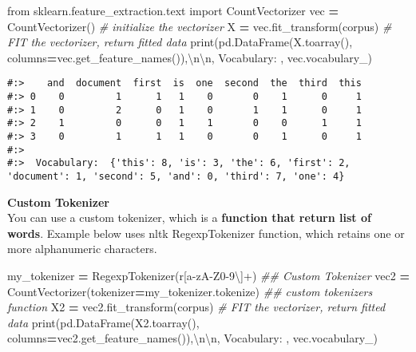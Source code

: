 \documentclass[
]{book}
\newenvironment{Shaded}{\begin{snugshade}}{\end{snugshade}}
\newcommand{\BuiltInTok}[1]{#1}
\newcommand{\CharTok}[1]{\textcolor[rgb]{0.5,0.5,0.5}{#1}}
\newcommand{\CommentTok}[1]{\textcolor[rgb]{0.37,0.37,0.37}{\textit{#1}}}
\newcommand{\ImportTok}[1]{#1}
\newcommand{\NormalTok}[1]{#1}
\newcommand{\OperatorTok}[1]{\textcolor[rgb]{0.43,0.43,0.43}{\textbf{#1}}}
\newcommand{\StringTok}[1]{\textcolor[rgb]{0.5,0.5,0.5}{#1}}
\newcommand{\VerbatimStringTok}[1]{\textcolor[rgb]{0.5,0.5,0.5}{#1}}
\begin{document}
\begin{Shaded}
\begin{Highlighting}[]
\ImportTok{from}\NormalTok{ sklearn.feature\_extraction.text }\ImportTok{import}\NormalTok{ CountVectorizer}
\NormalTok{vec }\OperatorTok{=}\NormalTok{ CountVectorizer()          }\CommentTok{\# initialize the vectorizer}
\NormalTok{X   }\OperatorTok{=}\NormalTok{ vec.fit\_transform(corpus)  }\CommentTok{\# FIT the vectorizer, return fitted data}
\BuiltInTok{print}\NormalTok{(pd.DataFrame(X.toarray(), columns}\OperatorTok{=}\NormalTok{vec.get\_feature\_names()),}\StringTok{\textquotesingle{}}\CharTok{\textbackslash{}n\textbackslash{}n}\StringTok{\textquotesingle{}}\NormalTok{,}
      \StringTok{\textquotesingle{}Vocabulary: \textquotesingle{}}\NormalTok{, vec.vocabulary\_)}
\end{Highlighting}
\end{Shaded}

\begin{verbatim}
#:>    and  document  first  is  one  second  the  third  this
#:> 0    0         1      1   1    0       0    1      0     1
#:> 1    0         2      0   1    0       1    1      0     1
#:> 2    1         0      0   1    1       0    0      1     1
#:> 3    0         1      1   1    0       0    1      0     1 
#:> 
#:>  Vocabulary:  {'this': 8, 'is': 3, 'the': 6, 'first': 2, 'document': 1, 'second': 5, 'and': 0, 'third': 7, 'one': 4}
\end{verbatim}

\textbf{Custom Tokenizer}\\
You can use a custom tokenizer, which is a \textbf{function that return list of words}. Example below uses nltk RegexpTokenizer function, which retains one or more alphanumeric characters.

\begin{Shaded}
\begin{Highlighting}[]
\NormalTok{my\_tokenizer }\OperatorTok{=}\NormalTok{ RegexpTokenizer(}\VerbatimStringTok{r\textquotesingle{}[a{-}zA{-}Z0{-}9\textbackslash{}\textquotesingle{}]+\textquotesingle{}}\NormalTok{)  }\CommentTok{\#\# Custom Tokenizer}
\NormalTok{vec2 }\OperatorTok{=}\NormalTok{ CountVectorizer(tokenizer}\OperatorTok{=}\NormalTok{my\_tokenizer.tokenize) }\CommentTok{\#\# custom tokenizer\textquotesingle{}s function}
\NormalTok{X2   }\OperatorTok{=}\NormalTok{ vec2.fit\_transform(corpus)  }\CommentTok{\# FIT the vectorizer, return fitted data}
\BuiltInTok{print}\NormalTok{(pd.DataFrame(X2.toarray(), columns}\OperatorTok{=}\NormalTok{vec2.get\_feature\_names()),}\StringTok{\textquotesingle{}}\CharTok{\textbackslash{}n\textbackslash{}n}\StringTok{\textquotesingle{}}\NormalTok{,}
      \StringTok{\textquotesingle{}Vocabulary: \textquotesingle{}}\NormalTok{, vec.vocabulary\_)}
\end{Highlighting}
\end{Shaded}
\end{document}
